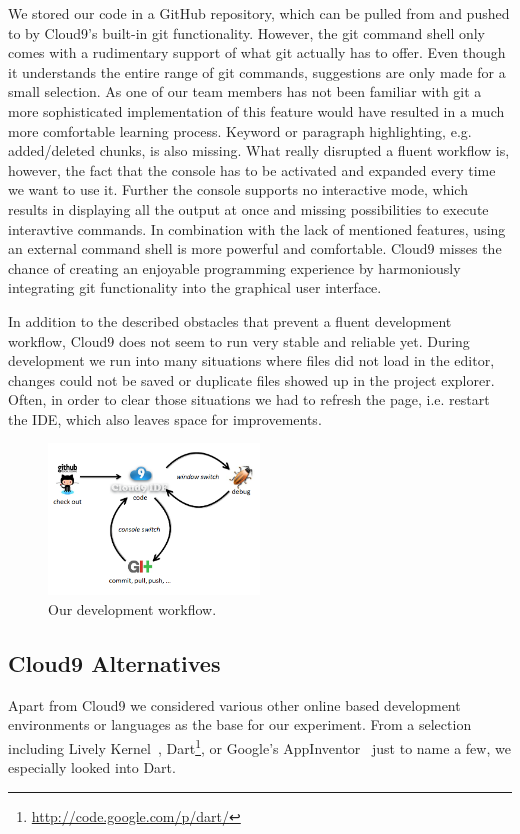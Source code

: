 We stored our code in a GitHub repository, which can be pulled from and pushed to by Cloud9's built-in git functionality.
However, the git command shell only comes with a rudimentary support of what git actually has to offer.
Even though it understands the entire range of git commands, suggestions are only made for a small selection.
As one of our team members has not been familiar with git a more sophisticated implementation of this feature would have
resulted in a much more comfortable learning process. Keyword or paragraph highlighting, e.g. added/deleted chunks,
is also missing. What really disrupted a fluent workflow is, however, the fact that the console has to be activated and
expanded every time we want to use it.
Further the console supports no interactive mode, which results in displaying all the output at once and missing possibilities to execute interavtive commands.
In combination with the lack of mentioned features, using an external command shell is more powerful and comfortable.
Cloud9 misses the chance of creating an enjoyable programming experience by harmoniously integrating git functionality into the graphical user interface.

In addition to the described obstacles that prevent
a fluent development workflow, Cloud9 does not seem to run very stable and reliable yet.
During development we run into many situations where files did not load in the editor, changes could not be saved or
duplicate files showed up in the project explorer. Often, in order to clear those situations we had to refresh the page,
i.e. restart the IDE, which also leaves space for improvements.

\begin{figure}
    \centering
    \includegraphics[width=0.5\textwidth]{images/workflow.png}
    \caption{Our development workflow.}
    \label{fig:workflow}
\end{figure}

\subsection{Cloud9 Alternatives}
Apart from Cloud9 we considered various other online based development environments or languages as the base for our experiment.
From a selection including Lively Kernel~\cite{Ingalls2008LKS},
Dart\footnote{\url{http://code.google.com/p/dart/}},
or Google's AppInventor~\cite{wolber2011app} just to name a few,
we especially looked into Dart.

